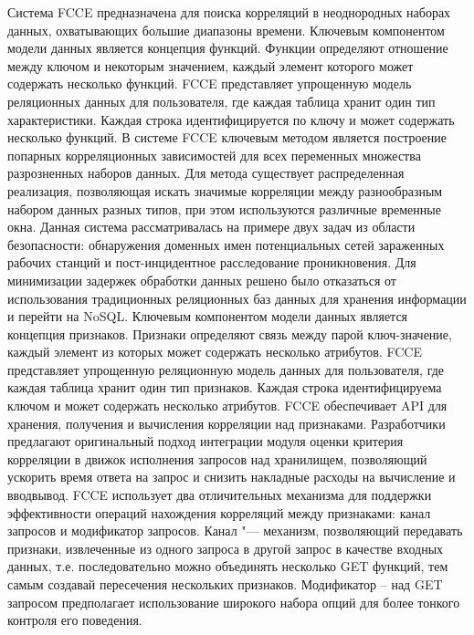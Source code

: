 Система FCCE \cite{schales2015fcce} предназначена для поиска корреляций в неоднородных наборах данных, охватывающих 
большие диапазоны времени. Ключевым компонентом модели данных является концепция функций. Функции определяют отношение 
между ключом и некоторым значением, каждый элемент которого может содержать несколько функций. FCCE представляет 
упрощенную модель реляционных данных для пользователя, где каждая таблица хранит один тип характеристики. Каждая 
строка идентифицируется по ключу и может содержать несколько функций. В системе FCCE ключевым методом является 
построение попарных корреляционных зависимостей для всех переменных множества разрозненных наборов данных. Для метода 
существует распределенная реализация, позволяющая искать значимые корреляции между разнообразным набором данных разных 
типов, при этом используются различные временные окна. Данная система рассматривалась на примере двух задач из области 
безопасности: обнаружения доменных имен потенциальных сетей зараженных рабочих станций и пост-инцидентное расследование 
проникновения. Для минимизации задержек обработки данных решено было отказаться от использования традиционных 
реляционных баз данных для хранения информации и перейти на NoSQL. Ключевым компонентом модели данных является 
концепция признаков. Признаки определяют связь между парой ключ-значение, каждый элемент из которых может содержать 
несколько атрибутов. FCCE представляет упрощенную реляционную модель данных для пользователя, где каждая таблица хранит 
один тип признаков. Каждая строка идентифицируема ключом и может содержать несколько атрибутов. FCCE обеспечивает 
API для хранения, получения и вычисления корреляции над признаками. Разработчики предлагают оригинальный подход 
интеграции модуля оценки критерия корреляции в движок исполнения запросов над хранилищем, позволяющий ускорить время 
ответа на запрос и снизить накладные расходы на вычисление и вводвывод. FCCE использует два отличительных механизма 
для поддержки эффективности операций нахождения корреляций между признаками: канал запросов и модификатор запросов. 
Канал "--- механизм, позволяющий передавать признаки, извлеченные из одного запроса в другой запрос в качестве входных 
данных, т.е. последовательно можно объединять несколько GET функций, тем самым создавай пересечения нескольких 
признаков. Модификатор – над GET запросом предполагает использование широкого набора опций для более тонкого контроля 
его поведения.

